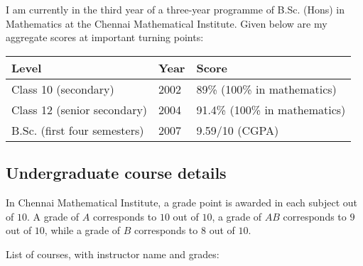 \documentclass[a4paper]{amsart}
\begin{document}
I am currently in the third year of a three-year programme of B.Sc.
(Hons) in Mathematics at the Chennai Mathematical Institute. Given below
are my aggregate scores at important turning points:

\begin{tabular}{|l|l|l|}
  \hline
  Level & Year  & Score\\
  \hline
  Class 10 (secondary) & 2002 & 89\% (100\% in mathematics)\\
  Class 12 (senior secondary) & 2004 & 91.4\% (100\% in mathematics)\\
  B.Sc. (first four semesters) & 2007 & 9.59/10 (CGPA)\\
  \hline
\end{tabular}

\subsection{Undergraduate course details}

In Chennai Mathematical Institute, a grade point is awarded in each
subject out of $10$. A grade of $A$ corresponds to $10$ out of $10$, a
grade of $AB$ corresponds to $9$ out of $10$, while a grade of $B$
corresponds to $8$ out of $10$.

List of courses, with instructor name and grades:
\end{document}
